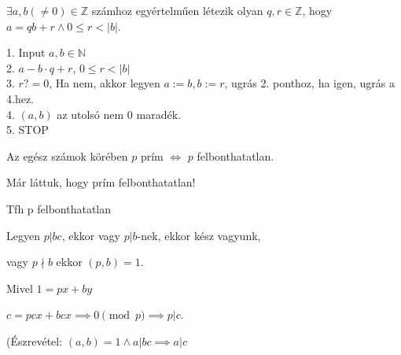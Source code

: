 \begin{frame}
  \begin{tcolorbox}[title={Tétel: Maradékos osztás $\mathbb{Z}$-ben}]
    ${\exists}a, b({\neq}0) \in \mathbb{Z}$ számhoz egyértelműen létezik olyan $q, r \in \mathbb{Z}$, hogy\\
    $a = qb + r \land 0 \leq r < |b|$.
  \end{tcolorbox}
\end{frame}

\begin{frame}
  \begin{tcolorbox}[title={Euklideszi algoritmus}]
    1. Input $a, b \in \mathbb{N}$\\
    2. $a - b \cdot q + r$, $0 \leq r < |b|$\\
    3. $r ?= 0$, Ha nem, akkor legyen $a := b, b := r$, ugrás 2. ponthoz, ha igen, ugrás a 4.hez.\\
    4. $(a, b)$ az utolsó nem $0$ maradék.\\
    5. STOP
  \end{tcolorbox}
\end{frame}

\begin{frame}
  \begin{tcolorbox}[title={Tétel: Prím és irreducibilis elem $\mathbb{Z}$-ben}]
    Az egész számok körében $p$ prím $\iff$ $p$ felbonthatatlan.
  \tcblower
    \mmedskip
  
    Már láttuk, hogy prím felbonthatatlan!\\
    \msmallskip
    
    Tfh p felbonthatatlan\\
    \msmallskip
    
    Legyen $p|bc$, ekkor vagy $p | b$-nek, ekkor kész vagyunk,\\
    \msmallskip
    
    vagy $p \nmid b$ ekkor $(p,b) = 1$.\\
    \msmallskip

    Mivel $1 = px + by$\\
    \msmallskip

    $c = pcx +bcx \implies 0 \pmod{p} \implies p | c$.\\
    \mmedskip
    
    (Észrevétel: $(a, b) = 1 \land a | bc \implies a | c$
  \end{tcolorbox}
\end{frame}

